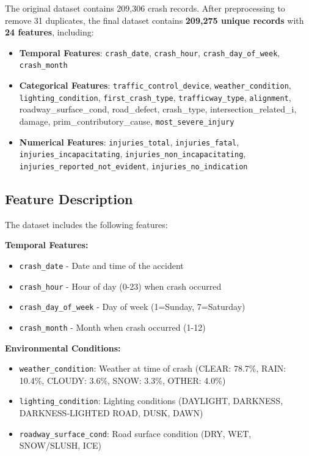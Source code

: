 \documentclass[stu,12pt,floatsintext]{apa7}
\begin{document}
The original dataset contains 209,306 crash records. After preprocessing to remove 31 duplicates, the final dataset contains \textbf{209,275 unique records} 
with \textbf{24 features}, including:

\begin{itemize}
    \item \textbf{Temporal Features}: \texttt{crash\_date}, \texttt{crash\_hour}, \texttt{crash\_day\_of\_week}, \texttt{crash\_month}
    \item \textbf{Categorical Features}: \texttt{traffic\_control\_device},	\texttt{weather\_condition}, \texttt{lighting\_condition}, \texttt{first\_crash\_type}, \texttt{trafficway\_type}, \texttt{alignment}, 
    {roadway\_surface\_cond}, {road\_defect}, {crash\_type}, {intersection\_related\_i}, {damage}, {prim\_contributory\_cause}, \texttt{most\_severe\_injury}
    \item \textbf{Numerical Features}: \texttt{injuries\_total}, \texttt{injuries\_fatal}, \texttt{injuries\_incapacitating}, \texttt{injuries\_non\_incapacitating}, \texttt{injuries\_reported\_not\_evident}, \texttt{injuries\_no\_indication}
\end{itemize}

\subsection{Feature Description}

The dataset includes the following features:

\textbf{Temporal Features:}
\begin{itemize}
    \item \texttt{crash\_date} - Date and time of the accident
    \item \texttt{crash\_hour} - Hour of day (0-23) when crash occurred
    \item \texttt{crash\_day\_of\_week} - Day of week (1=Sunday, 7=Saturday)
    \item \texttt{crash\_month} - Month when crash occurred (1-12)
\end{itemize}

\textbf{Environmental Conditions:}
\begin{itemize}
    \item \texttt{weather\_condition}: Weather at time of crash (CLEAR: 78.7\%, RAIN: 10.4\%, CLOUDY: 3.6\%, SNOW: 3.3\%, OTHER: 4.0\%)
    \item \texttt{lighting\_condition}: Lighting conditions (DAYLIGHT, DARKNESS, DARKNESS-LIGHTED ROAD, DUSK, DAWN)
    \item \texttt{roadway\_surface\_cond}: Road surface condition (DRY, WET, SNOW/SLUSH, ICE)
\end{itemize}
\end{document}
